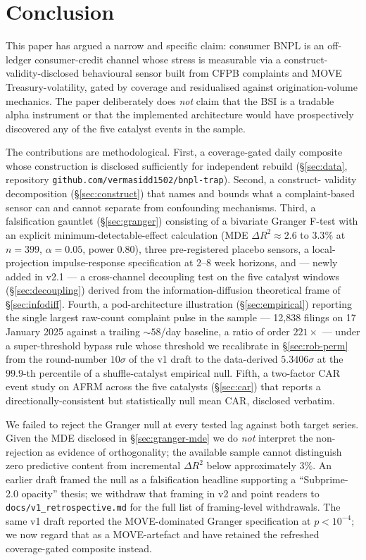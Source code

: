 \documentclass[11pt,letterpaper]{article}
\begin{document}
\section{Conclusion}
\label{sec:conclusion}

This paper has argued a narrow and specific claim: consumer BNPL is
an off-ledger consumer-credit channel whose stress is measurable via
a construct-validity-disclosed behavioural sensor built from CFPB
complaints and MOVE Treasury-volatility, gated by coverage and
residualised against origination-volume mechanics. The paper
deliberately does \emph{not} claim that the BSI is a tradable alpha
instrument or that the implemented architecture would have
prospectively discovered any of the five catalyst events in the
sample.

The contributions are methodological. First, a coverage-gated daily
composite whose construction is disclosed sufficiently for
independent rebuild (\S\ref{sec:data}, repository
\texttt{github.com/vermasidd1502/bnpl-trap}). Second, a construct-
validity decomposition (\S\ref{sec:construct}) that names and bounds
what a complaint-based sensor can and cannot separate from
confounding mechanisms. Third, a falsification gauntlet
(\S\ref{sec:granger}) consisting of a bivariate Granger F-test with
an explicit minimum-detectable-effect calculation (MDE $\Delta R^2
\approx 2.6$ to $3.3\%$ at $n = 399$, $\alpha = 0.05$, power $0.80$),
three pre-registered placebo sensors, a local-projection
impulse-response specification at 2--8 week horizons, and --- newly
added in v2.1 --- a cross-channel decoupling test on the five
catalyst windows (\S\ref{sec:decoupling}) derived from the
information-diffusion theoretical frame of \S\ref{sec:infodiff}.
Fourth, a pod-architecture illustration (\S\ref{sec:empirical})
reporting the single largest raw-count complaint pulse in the sample
--- 12{,}838 filings on 17 January 2025 against a trailing
$\sim\!58$/day baseline, a ratio of order $221\times$ --- under a
super-threshold bypass rule whose threshold we recalibrate in
\S\ref{sec:rob-perm} from the round-number $10\sigma$ of the v1
draft to the data-derived $5.3406\sigma$ at the $99.9$-th percentile
of a shuffle-catalyst empirical null. Fifth, a two-factor CAR event
study on AFRM across the five catalysts (\S\ref{sec:car}) that
reports a directionally-consistent but statistically null mean CAR,
disclosed verbatim.

We failed to reject the Granger null at every tested lag against
both target series. Given the MDE disclosed in
\S\ref{sec:granger-mde} we do \emph{not} interpret the non-rejection
as evidence of orthogonality; the available sample cannot distinguish
zero predictive content from incremental $\Delta R^2$ below
approximately $3\%$. An earlier draft framed the null as a
falsification headline supporting a ``Subprime-2.0 opacity'' thesis;
we withdraw that framing in v2 and point readers to
\texttt{docs/v1\_retrospective.md} for the full list of framing-level
withdrawals. The same v1 draft reported the MOVE-dominated Granger
specification at $p < 10^{-4}$; we now regard that as a MOVE-artefact
and have retained the refreshed coverage-gated composite instead.
\end{document}
